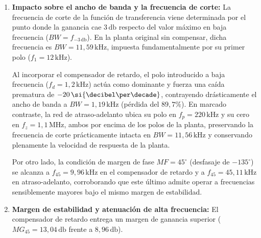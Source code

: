 \begin{enumerate}
    \item \textbf{Impacto sobre el ancho de banda y la frecuencia de corte:} La frecuencia de corte de la función de
    transferencia viene determinada por el punto donde la ganancia cae $3\,\si{\decibel}$ respecto del valor máximo en
    baja frecuencia ($BW = f_{-3\,\si{\decibel}}$). En la planta original sin compensar, dicha frecuencia es
    $BW = 11,59\,\si{\kilo\hertz}$, impuesta fundamentalmente por su primer polo ($f_1 = 12\,\si{\kilo\hertz}$).

    Al incorporar el compensador de retardo, el polo introducido a baja frecuencia ($f_d = 1,2\,\si{\kilo\hertz}$) actúa como
    dominante y fuerza una caída prematura de $-20\,\si{\decibel\per\decade}$, contrayendo drásticamente el ancho de banda a
    $BW = 1,19\,\si{\kilo\hertz}$ (pérdida del $89,7\%$). En marcado contraste, la red de atraso-adelanto ubica su polo en
    $f_p = 220\,\si{\kilo\hertz}$ y su cero en $f_z = 1,1\,\si{\mega\hertz}$, ambos por encima de los polos de la planta,
    preservando la frecuencia de corte prácticamente intacta en $BW = 11,56\,\si{\kilo\hertz}$ y conservando plenamente la
    velocidad de respuesta de la planta.

    Por otro lado, la condición de margen de fase $MF = 45^\circ$ (desfasaje de $-135^\circ$) se alcanza a $f_{45} = 9,96\,\si{\kilo\hertz}$
    en el compensador de retardo y a $f_{45} = 45,11\,\si{\kilo\hertz}$ en atraso-adelanto, corroborando que este último admite
    operar a frecuencias sensiblemente mayores bajo el mismo margen de estabilidad.

    \item \textbf{Margen de estabilidad y atenuación de alta frecuencia:} El compensador de retardo entrega un margen de ganancia
    superior ($MG_{45} = 13,04\,\si{\decibel}$ frente a $8,96\,\si{\decibel}$).

\end{enumerate}

